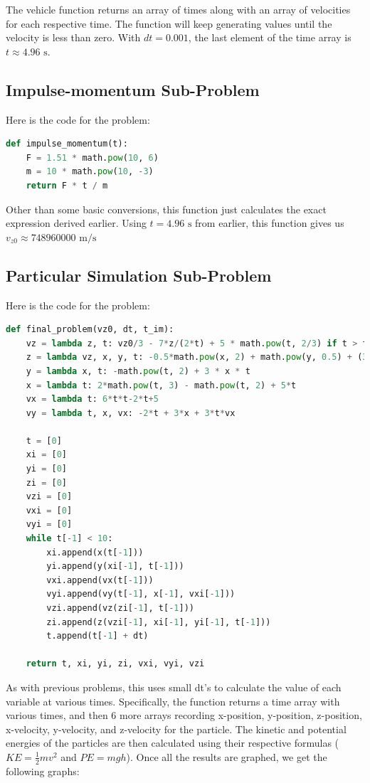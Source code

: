 \documentclass[10pt,letterpaper]{article}
\begin{document}
			The vehicle function returns an array of times along with an array of velocities for each respective time. The function will keep generating values until the velocity is less than zero.
			With $dt = 0.001$, the last element of the time array is $t\approx \boxed{4.96 \textrm{ s}}$.
		\subsection{Impulse-momentum Sub-Problem}
			 Here is the code for the problem:
			 \begin{lstlisting}[language=Python]
def impulse_momentum(t):
	F = 1.51 * math.pow(10, 6)
	m = 10 * math.pow(10, -3)
	return F * t / m
			 \end{lstlisting}

			 Other than some basic conversions, this function just calculates the exact expression derived earlier. Using $t=4.96\textrm{ s}$ from earlier, this function gives us $v_{z0}\approx \boxed{748960000 \textrm{ m/s}}$ 
		\subsection{Particular Simulation Sub-Problem}
			 Here is the code for the problem:
			 \begin{lstlisting}[language=Python]
def final_problem(vz0, dt, t_im):
	vz = lambda z, t: vz0/3 - 7*z/(2*t) + 5 * math.pow(t, 2/3) if t > t_im else vz0
	z = lambda vz, x, y, t: -0.5*math.pow(x, 2) + math.pow(y, 0.5) + (3*x*vz*t/(2*y) if t > 0 else 0) - 2*math.pow(abs(vz), 1/4)
	y = lambda x, t: -math.pow(t, 2) + 3 * x * t
	x = lambda t: 2*math.pow(t, 3) - math.pow(t, 2) + 5*t
	vx = lambda t: 6*t*t-2*t+5
	vy = lambda t, x, vx: -2*t + 3*x + 3*t*vx

	t = [0]
	xi = [0]
	yi = [0]
	zi = [0]
	vzi = [0]
	vxi = [0]
	vyi = [0]
	while t[-1] < 10:
		xi.append(x(t[-1]))
		yi.append(y(xi[-1], t[-1]))
		vxi.append(vx(t[-1]))
		vyi.append(vy(t[-1], x[-1], vxi[-1]))
		vzi.append(vz(zi[-1], t[-1]))
		zi.append(z(vzi[-1], xi[-1], yi[-1], t[-1]))
		t.append(t[-1] + dt)

	return t, xi, yi, zi, vxi, vyi, vzi
			 \end{lstlisting}

			 As with previous problems, this uses small dt's to calculate the value of each variable at various times. Specifically, the function returns a time array with various times, and then 6 more arrays recording x-position, 
			 y-position, z-position, x-velocity, y-velocity, and z-velocity for the particle. The kinetic and potential energies of the particles are then calculated using their respective formulas ($KE=\frac{1}{2}mv^2$ and $PE=mgh$).
			 Once all the results are graphed, we get the following graphs:
\end{document}
